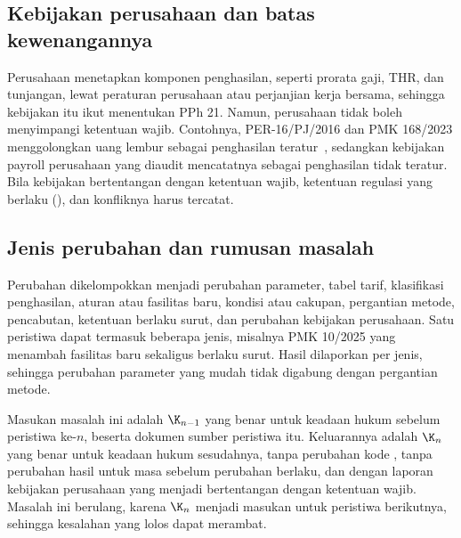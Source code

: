 \subsection{Kebijakan perusahaan dan batas kewenangannya}
\label{subsec:kebijakan}

Perusahaan menetapkan komponen penghasilan, seperti prorata gaji, THR, dan tunjangan, lewat peraturan perusahaan atau perjanjian kerja bersama, sehingga kebijakan itu ikut menentukan PPh 21. Namun, perusahaan tidak boleh menyimpangi ketentuan wajib. Contohnya, PER-16/PJ/2016 dan PMK 168/2023 menggolongkan uang lembur sebagai penghasilan teratur~\cite{per16_2016,pmk168_2023}, sedangkan kebijakan payroll perusahaan yang diaudit mencatatnya sebagai penghasilan tidak teratur. Bila kebijakan bertentangan dengan ketentuan wajib, ketentuan regulasi yang berlaku (), dan konfliknya harus tercatat.

\subsection{Jenis perubahan dan rumusan masalah}
\label{subsec:rumusan}

Perubahan dikelompokkan menjadi perubahan parameter, tabel tarif, klasifikasi penghasilan, aturan atau fasilitas baru, kondisi atau cakupan, pergantian metode, pencabutan, ketentuan berlaku surut, dan perubahan kebijakan perusahaan. Satu peristiwa dapat termasuk beberapa jenis, misalnya PMK 10/2025 yang menambah fasilitas baru sekaligus berlaku surut. Hasil dilaporkan per jenis, sehingga perubahan parameter yang mudah tidak digabung dengan pergantian metode.

Masukan masalah ini adalah  $\K_{n-1}$ yang benar untuk keadaan hukum sebelum peristiwa ke-$n$, beserta dokumen sumber peristiwa itu. Keluarannya adalah $\K_n$ yang benar untuk keadaan hukum sesudahnya, tanpa perubahan kode , tanpa perubahan hasil untuk masa sebelum perubahan berlaku, dan dengan laporan kebijakan perusahaan yang menjadi bertentangan dengan ketentuan wajib. Masalah ini berulang, karena $\K_n$ menjadi masukan untuk peristiwa berikutnya, sehingga kesalahan yang lolos dapat merambat.

